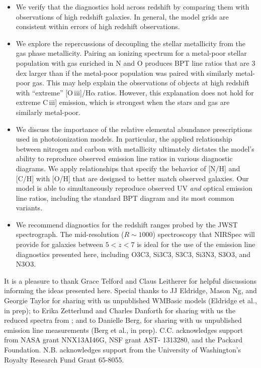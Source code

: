 \documentclass[preprint2]{aastex61}
\newcommand{\oiii}{[O\,{\sc iii}]\xspace}
\newcommand{\ciii}{C\,{\sc iii}]\xspace}
\newcommand{\ha}{\ensuremath{\mathrm{H\alpha}}\xspace}
\begin{document}
\begin{itemize}
    \item We verify that the diagnostics hold across redshift by comparing them with observations of high redshift galaxies. In general, the model grids are consistent within errors of high redshift observations.
    \item We explore the repercussions of decoupling the stellar metallicity from the gas phase metallicity. Pairing an ionizing spectrum for a metal-poor stellar population with gas enriched in N and O produces BPT line ratios that are 3 dex larger than if the metal-poor population was paired with similarly metal-poor gas. This may help explain the observations of objects at high redshift with ``extreme'' \oiii/\ha ratios. However, this explanation does not hold for extreme \ciii emission, which is strongest when the stars and gas are similarly metal-poor.
    \item We discuss the importance of the relative elemental abundance prescriptions used in photoionization models. In particular, the applied relationship between nitrogen and carbon with metallicity ultimately dictates the model's ability to reproduce observed emission line ratios in various diagnostic diagrams. We apply relationships that specify the behavior of [N/H] and [C/H] with [O/H] that are designed to better match observed galaxies. Our model is able to simultaneously reproduce observed UV \emph{and} optical emission line ratios, including the standard BPT diagram and its most common variants.
    \item We recommend diagnostics for the redshift ranges probed by the JWST spectrograph. The mid-resolution ($R\sim1000$) spectroscopy that NIRSpec will provide for galaxies between $5 < z < 7$ is ideal for the use of the emission line diagnostics presented here, including O3C3, Si3C3, S3C3, Si3N3, S3O3, and N3O3. 
\end{itemize}

\acknowledgments

It is a pleasure to thank Grace Telford and Claus Leitherer for helpful discussions informing the ideas presented here. Special thanks to JJ Eldridge, Mason Ng, and Georgie Taylor for sharing with us unpublished WMBasic models (Eldridge et al., in prep); to Erika Zetterlund and Charles Danforth for sharing with us the reduced spectra from \citet{Zetterlund+2015}; and to Danielle Berg, for sharing with us unpublished emission line measurements (Berg et al., in prep). C.C. acknowledges support from NASA grant NNX13AI46G, NSF grant AST- 1313280, and the Packard Foundation. N.B. acknowledges support from the University of Washington's Royalty Research Fund Grant 65-8055.



\end{document}
